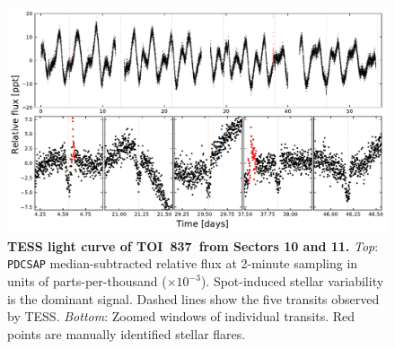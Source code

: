 \documentclass[12pt,twocolumn,tighten]{aastex62}
\newcommand{\tn}{TOI~837} %
\begin{document}
\begin{figure}[t!]
	\begin{center}
		\leavevmode
		\includegraphics[width=1\textwidth]{f1.pdf}
	\end{center}
	\vspace{-0.7cm}
	\caption{
    {\bf TESS light curve of \tn\ from Sectors 10 and 11.} {\it Top}:
    \texttt{PDCSAP} median-subtracted relative flux at 2-minute
    sampling in units of parts-per-thousand ($\times 10^{-3}$).
    Spot-induced stellar variability is the dominant signal.  Dashed
    lines show the five transits observed by TESS.  {\it Bottom}:
    Zoomed windows of individual transits.  Red points are manually
    identified stellar flares.
		\label{fig:rawzoom}
	}
\end{figure}
\end{document}
